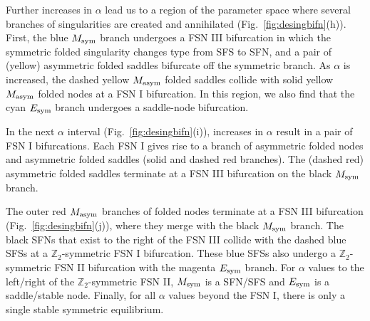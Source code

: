 \documentclass[10pt,onecolumn]{article}
\theoremstyle{plain}
\begin{document}
Further increases in $\alpha$ lead us to a region of the parameter space where several branches of singularities are created and annihilated (Fig.~\ref{fig:desingbifn}(h)). First, the blue $M_{\rm sym}$ branch undergoes a FSN III bifurcation in which the symmetric folded singularity changes type from SFS to SFN, and a pair of (yellow) asymmetric folded saddles bifurcate off the symmetric branch. 
As $\alpha$ is increased, the dashed yellow $M_{\rm asym}$ folded saddles collide with solid yellow $M_{\rm asym}$ folded nodes at a FSN I bifurcation. 
In this region, we also find that the cyan $E_{\rm sym}$ branch undergoes a saddle-node bifurcation. 

In the next $\alpha$ interval (Fig.~\ref{fig:desingbifn}(i)), increases in $\alpha$ result in a pair of FSN I bifurcations. Each FSN I gives rise to a branch of asymmetric folded nodes and asymmetric folded saddles (solid and dashed red branches). The (dashed red) asymmetric folded saddles terminate at a FSN III bifurcation on the black $M_{\rm sym}$ branch. 

The outer red $M_{\rm asym}$ branches of folded nodes terminate at a FSN III bifurcation (Fig.~\ref{fig:desingbifn}(j)), where they merge with the black $M_{\rm sym}$ branch. 
The black SFNs that exist to the right of the FSN III collide with the dashed blue SFSs at a $\mathbb Z_2$-symmetric FSN I bifurcation. 
These blue SFSs also undergo a $\mathbb Z_2$-symmetric FSN II bifurcation with the magenta $E_{\rm sym}$ branch. 
For $\alpha$ values to the left/right of the $\mathbb Z_2$-symmetric FSN II, $M_{\rm sym}$ is a SFN/SFS and $E_{\rm sym}$ is a saddle/stable node. 
Finally, for all $\alpha$ values beyond the FSN I, there is only a single stable symmetric equilibrium.
\end{document}
